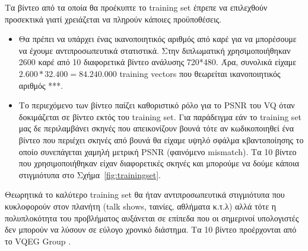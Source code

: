 \indent Τα βίντεο από τα οποία θα προέκυπτε το training set έπρεπε να επιλεχθούν προσεκτικά γιατί χρειάζεται να πληρούν κάποιες προϋποθέσεις.
\begin{itemize}
    \item Θα πρέπει να υπάρχει ένας ικανοποιητικός αριθμός από καρέ για να μπορέσουμε να έχουμε αντιπροσωπευτικά στατιστικά. Στην διπλωματική χρησιμοποιήθηκαν 2600 καρέ από 10 διαφορετικά βίντεο ανάλυσης 720*480. Άρα, συνολικά είχαμε $2.600*32.400 = 84.240.000$ training vectors που θεωρείται ικανοποιητικός αριθμός ***.
    \item Το περιεχόμενο των βίντεο παίζει καθοριστικό ρόλο για το PSNR του VQ όταν δοκιμάζεται σε βίντεο εκτός του training set. Για παράδειγμα εάν το training set μας δε περιλαμβάνει σκηνές που απεικονίζουν βουνά τότε αν κωδικοποιηθεί ένα βίντεο που περιέχει σκηνές από βουνά θα είχαμε υψηλό σφάλμα κβαντοποίησης το οποίο συνεπάγεται χαμηλή μετρική PSNR (φαινόμενο mismatch). Τα 10 βίντεο που χρησιμοποιήθηκαν είχαν διαφορετικές σκηνές και μπορούμε να δούμε κάποια στιγμιότυπα στο Σχήμα~\ref{fig:trainingset}.
\end{itemize}

\indent Θεωρητικά το καλύτερο training set θα ήταν αντιπροσωπευτικά στιγμιότυπα που κυκλοφορούν στον πλανήτη (talk shows, ταινίες, αθλήματα κ.τ.λ) αλλά τότε η πολυπλοκότητα του προβλήματος αυξάνεται σε επίπεδα που οι σημερινοί υπολογιστές δεν μπορούν να λύσουν σε εύλογο χρονικό διάστημα. Τα 10 βίντεο προέρχονται από το VQEG Group \cite{misc:vqeg}.

